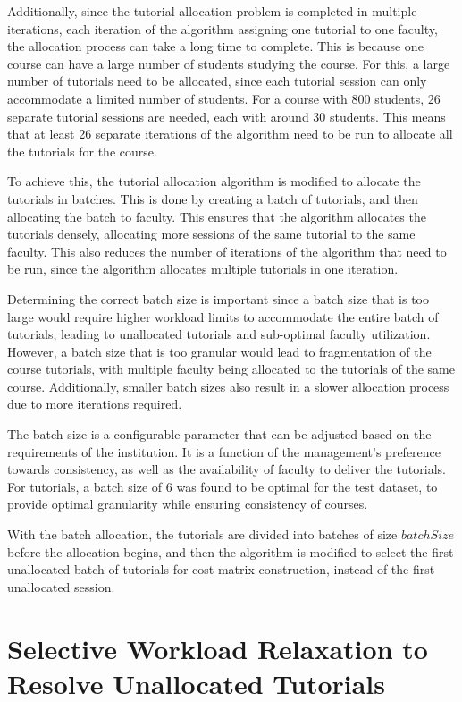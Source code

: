Additionally, since the tutorial allocation problem is completed in multiple iterations, each iteration of the algorithm assigning one tutorial to one faculty, the allocation process can take a long time to complete. This is because one course can have a large number of students studying the course. For this, a large number of tutorials need to be allocated, since each tutorial session can only accommodate a limited number of students. For a course with 800 students, 26 separate tutorial sessions are needed, each with around 30 students. This means that at least 26 separate iterations of the algorithm need to be run to allocate all the tutorials for the course.

To achieve this, the tutorial allocation algorithm is modified to allocate the tutorials in batches. This is done by creating a batch of tutorials, and then allocating the batch to faculty. This ensures that the algorithm allocates the tutorials densely, allocating more sessions of the same tutorial to the same faculty. This also reduces the number of iterations of the algorithm that need to be run, since the algorithm allocates multiple tutorials in one iteration.

Determining the correct batch size is important since a batch size that is too large would require higher workload limits to accommodate the entire batch of tutorials, leading to unallocated tutorials and sub-optimal faculty utilization. However, a batch size that is too granular would lead to fragmentation of the course tutorials, with multiple faculty being allocated to the tutorials of the same course. Additionally, smaller batch sizes also result in a slower allocation process due to more iterations required.

The batch size is a configurable parameter that can be adjusted based on the requirements of the institution. It is a function of the management's preference towards consistency, as well as the availability of faculty to deliver the tutorials. For tutorials, a batch size of 6 was found to be optimal for the test dataset, to provide optimal granularity while ensuring consistency of courses.

With the batch allocation, the tutorials are divided into batches of size $batchSize$ before the allocation begins, and then the algorithm is modified to select the first unallocated batch of tutorials for cost matrix construction, instead of the first unallocated session.


\section{Selective Workload Relaxation to Resolve Unallocated Tutorials}

